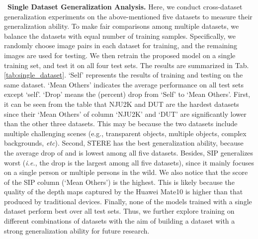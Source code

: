 \documentclass[journal]{IEEEtran}
\newcommand{\tabref}[1]{Tab. \ref{#1}}
\newcommand{\myPara}[1]{\vspace{10pt}\noindent~\textbf{#1} \quad}
\def\ie{\emph{i.e.}}
\def\etc{\emph{etc}}
\begin{document}
\myPara{\textbf{Single Dataset Generalization Analysis.}} Here, we conduct cross-dataset generalization experiments on the above-mentioned five datasets to measure their generalization ability.
To make fair comparisons among multiple datasets, we balance the datasets with equal number of training samples.
Specifically, we randomly choose  image pairs in each dataset for training, and the remaining images are used for testing.
We then retrain the proposed model on a single training set, and test it on all four test sets.
The results are summarized in \tabref{tab:single_dataset}.
`Self' represents the results of training and testing on the same dataset.
`Mean Others' indicates the average performance on all test sets except ‘self’.
`Drop' means the (percent) drop from `Self' to `Mean Others'.
First, it can be seen from the table that NJU2K and DUT are the hardest datasets since their `Mean Others' of column `NJU2K' and `DUT' are significantly lower than the other three datasets.
This may be because the two datasets include multiple challenging scenes (e.g., transparent objects, multiple objects, complex backgrounds, \etc).
Second, STERE has the best generalization ability, because the average drop of  and  is lowest among all five datasets.
Besides, SIP generalizes worst (\ie, the drop is the largest among all five datasets), since it mainly focuses on a single person or multiple persons in the wild.
We also notice that the score of the SIP column (`Mean Others') is the highest.
This is likely because the quality of the depth maps captured by the Huawei Mate10 is higher than that produced by traditional devices.
Finally, none of the models trained with a single dataset perform best over all test sets.
Thus, we further explore training on different combinations of datasets with the aim of building a dataset with a strong generalization ability for future research.\par
\end{document}

